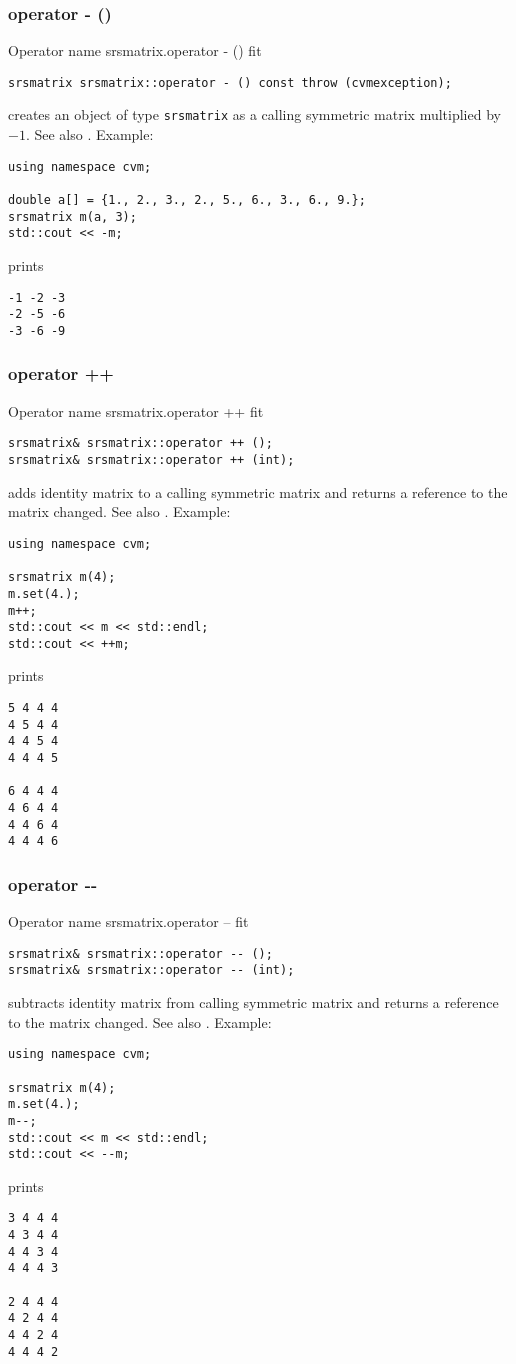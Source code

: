 \subsubsection{operator - ()}
Operator%
\pdfdest name {srsmatrix.operator - ()} fit
\begin{verbatim}
srsmatrix srsmatrix::operator - () const throw (cvmexception);
\end{verbatim}
creates an object of type \verb"srsmatrix" as
a calling symmetric matrix multiplied by $-1$.
See also .
Example:
\begin{Verbatim}
using namespace cvm;

double a[] = {1., 2., 3., 2., 5., 6., 3., 6., 9.};
srsmatrix m(a, 3);
std::cout << -m;
\end{Verbatim}
prints
\begin{Verbatim}
-1 -2 -3
-2 -5 -6
-3 -6 -9
\end{Verbatim}
\newpage



\subsubsection{operator ++}
Operator%
\pdfdest name {srsmatrix.operator ++} fit
\begin{verbatim}
srsmatrix& srsmatrix::operator ++ ();
srsmatrix& srsmatrix::operator ++ (int);
\end{verbatim}
adds identity matrix to a calling symmetric matrix
and returns a reference to
the matrix changed.
See also .
Example:
\begin{Verbatim}
using namespace cvm;

srsmatrix m(4);
m.set(4.);
m++;
std::cout << m << std::endl;
std::cout << ++m;
\end{Verbatim}
prints
\begin{Verbatim}
5 4 4 4
4 5 4 4
4 4 5 4
4 4 4 5

6 4 4 4
4 6 4 4
4 4 6 4
4 4 4 6
\end{Verbatim}
\newpage



\subsubsection{operator -{}-}
Operator%
\pdfdest name {srsmatrix.operator --} fit
\begin{verbatim}
srsmatrix& srsmatrix::operator -- ();
srsmatrix& srsmatrix::operator -- (int);
\end{verbatim}
subtracts identity matrix from  calling symmetric matrix
and returns a reference to
the matrix changed.
See also .
Example:
\begin{Verbatim}
using namespace cvm;

srsmatrix m(4);
m.set(4.);
m--;
std::cout << m << std::endl;
std::cout << --m;
\end{Verbatim}
prints
\begin{Verbatim}
3 4 4 4
4 3 4 4
4 4 3 4
4 4 4 3

2 4 4 4
4 2 4 4
4 4 2 4
4 4 4 2
\end{Verbatim}
\newpage



